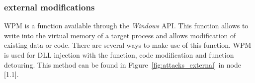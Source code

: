 \subsubsection{ external modifications}
\gls{WPM} is a function available through the \emph{Windows} \gls{API}. This function allows to write into the virtual memory of a target process and allows modification of existing data or code. There are several ways to make use of this function. \gls{WPM} is used for \gls{DLL} injection with the  function, code modification and function detouring. This method can be found in Figure~\ref{fig:attacks_external} in node [1.1].


